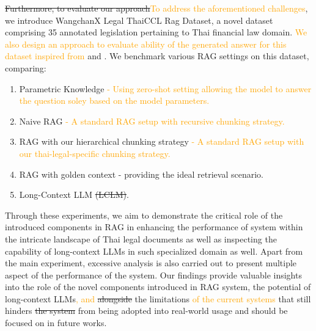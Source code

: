 \st{Furthermore, to evaluate our approach}\textcolor{orange}{To address the aforementioned challenges}, we introduce WangchanX Legal ThaiCCL Rag Dataset, a novel dataset comprising 35 annotated legislation pertaining to Thai financial law domain. 
\textcolor{orange}{We also design an approach to evaluate ability of the generated answer for this dataset inspired from \cite{needleinahaystack}} and \cite{}.
We benchmark various RAG settings on this dataset, comparing:
\begin{enumerate}
    \item Parametric Knowledge \textcolor{orange}{ - Using zero-shot setting allowing the model to answer the question soley based on the model parameters.}
    \item Naive RAG \textcolor{orange}{ - A standard RAG setup with recursive chunking strategy.}
    \item RAG with our hierarchical chunking strategy \textcolor{orange}{ - A standard RAG setup with our thai-legal-specific chunking strategy.}
    \item RAG with golden context - providing the ideal retrieval scenario.
    \item Long-Context LLM\st{ (LCLM)}.
\end{enumerate}


Through these experiments, we aim to demonstrate the critical role of the introduced components in RAG in enhancing the performance of system within the intricate landscape of Thai legal documents as well as inspecting the capability of long-context LLMs in such specialized domain as well. 
Apart from the main experiment, excessive analysis is also carried out to present multiple aspect of the performance of the system.
Our findings provide valuable insights into the role of the novel components introduced in RAG system, the potential of long-context LLMs\textcolor{orange}{, and}\st{ alongside} the limitations \textcolor{orange}{of the current systems} that still hinders \st{the system} from being adopted into real-world usage and should be focused on in future works.

